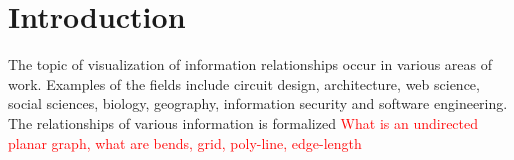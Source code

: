 \section{Introduction}
The topic of visualization of information relationships occur in various areas of work. Examples of the fields include circuit design, architecture, web science, social sciences, biology, geography, information security and software engineering. The relationships of various information is formalized \textcolor{red}{What is an undirected planar graph, what are bends, grid, poly-line, edge-length}
